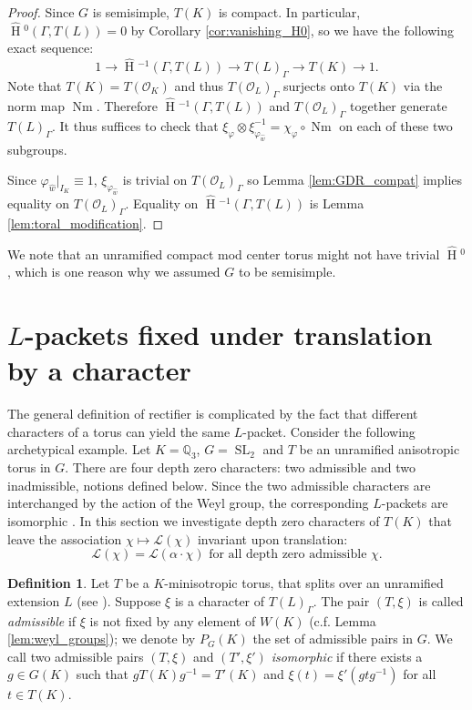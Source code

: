 \documentclass[11pt]{amsart}
\theoremstyle{plain}
\newcommand{\HT}[1]{\hat{\HH}{}^{#1}}
\theoremstyle{definition}
\newtheorem{definition}[theorem]{Definition}
\DeclareMathOperator{\HH}{H}
\DeclareMathOperator{\Nm}{Nm}
\DeclareMathOperator{\SL}{SL}
\newcommand{\OK}{\mathcal{O}_K}
\newcommand{\OL}{\mathcal{O}_L}
\newcommand{\QQ}{\mathbb{Q}}
\newcommand{\Lpack}{\mathcal{L}}
\begin{document}
\begin{proof}
Since $G$ is semisimple, $T(K)$ is compact.  In particular,
$\HT{0}(\Gamma, T(L)) = 0$ by Corollary \ref{cor:vanishing_H0},
so we have the following exact sequence:
$$1 \rightarrow \HT{-1}(\Gamma, T(L)) \rightarrow T(L)_{\Gamma} \rightarrow T(K) \rightarrow 1.$$
Note that $T(K) = T(\OK)$ and thus
$T(\OL)_{\Gamma}$ surjects onto $T(K)$ via the norm map
$\Nm$.  Therefore $\HT{-1}(\Gamma,T(L))$ and
$T(\OL)_{\Gamma}$ together generate $T(L)_{\Gamma}$.  It thus suffices to check that
$\xi_{\varphi} \otimes \xi_{\varphi_{\hat{w}}}^{-1} = \chi_{\varphi} \circ \Nm$
on each of these two subgroups.

Since $\varphi_{\hat{w}}|_{I_K} \equiv 1$, $\xi_{\varphi_{\hat{w}}}$ is trivial on
$T(\OL)_{\Gamma}$ so Lemma
\ref{lem:GDR_compat} implies equality on $T(\OL)_{\Gamma}$.
Equality on $\HT{-1}(\Gamma,T(L))$ is Lemma \ref{lem:toral_modification}.
\end{proof}

We note that an unramified compact mod center torus might not have trivial $\HT{0}$, which is one reason why we assumed $G$ to be semisimple.

\section{$L$-packets fixed under translation by a character}\label{Q_T}

The general definition of rectifier is complicated by the fact that different
characters of a torus can yield the same $L$-packet.  Consider the following archetypical example.
Let $K = \QQ_3$, $G = \SL_2$ and $T$ be an unramified anisotropic torus in $G$.  There are four depth zero
characters: two admissible and two inadmissible, notions defined below.  Since the two admissible characters are interchanged
by the action of the Weyl group, the corresponding $L$-packets are isomorphic \cite[\S10]{murnaghan:11}.
In this section we investigate depth zero characters of $T(K)$ that leave the association $\chi \mapsto \Lpack(\chi)$ invariant upon translation:
$$\Lpack(\chi) = \Lpack(\alpha\cdot\chi) \mbox{ for all depth zero admissible $\chi$}.$$

\begin{definition} \label{def:admissible}
Let $T$ be a $K$-minisotropic torus, that splits over an unramified
extension $L$ (see \cite[\S3]{reeder:08a}).  Suppose $\xi$ is a character of $T(L)_{\Gamma}$.
The pair $(T, \xi)$ is called \emph{admissible} if $\xi$ is not fixed
by any element of $W(K)$ (c.f. Lemma \ref{lem:weyl_groups}); we
denote by $P_G(K)$ the set of admissible pairs in $G$. We call
two admissible pairs $(T, \xi)$ and $(T', \xi')$ \emph{isomorphic} if there
exists a $g \in G(K)$ such that $gT(K)g^{-1} = T'(K)$ and $\xi(t) = \xi'(gtg^{-1})$
for all $t \in T(K)$.
\end{definition}
\end{document}
